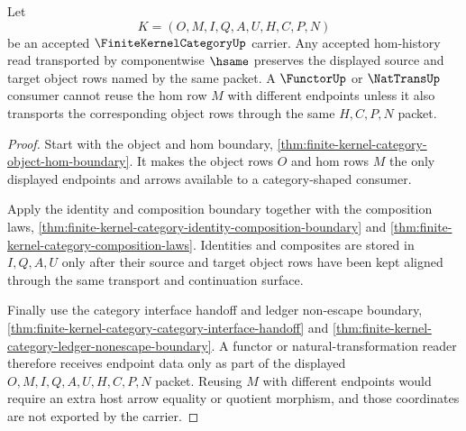 \begin{theorem}
\label{thm:finite-kernel-category-hom-endpoint-transport-determinacy}
Let
$$
K=(O,M,I,Q,A,U,H,C,P,N)
$$
be an accepted $\FiniteKernelCategoryUp$ carrier. Any accepted hom-history
read transported by componentwise $\hsame$ preserves the displayed source and
target object rows named by the same packet. A $\FunctorUp$ or $\NatTransUp$
consumer cannot reuse the hom row $M$ with different endpoints unless it also
transports the corresponding object rows through the same $H,C,P,N$ packet.
\end{theorem}
\begin{proof}
Start with the object and hom boundary,
\autoref{thm:finite-kernel-category-object-hom-boundary}. It makes the object
rows $O$ and hom rows $M$ the only displayed endpoints and arrows available
to a category-shaped consumer.

Apply the identity and composition boundary together with the composition
laws, \autoref{thm:finite-kernel-category-identity-composition-boundary} and
\autoref{thm:finite-kernel-category-composition-laws}. Identities and
composites are stored in $I,Q,A,U$ only after their source and target object
rows have been kept aligned through the same transport and continuation
surface.

Finally use the category interface handoff and ledger non-escape boundary,
\autoref{thm:finite-kernel-category-category-interface-handoff} and
\autoref{thm:finite-kernel-category-ledger-nonescape-boundary}. A functor or
natural-transformation reader therefore receives endpoint data only as part
of the displayed $O,M,I,Q,A,U,H,C,P,N$ packet. Reusing $M$ with different
endpoints would require an extra host arrow equality or quotient morphism,
and those coordinates are not exported by the carrier.
\end{proof}

